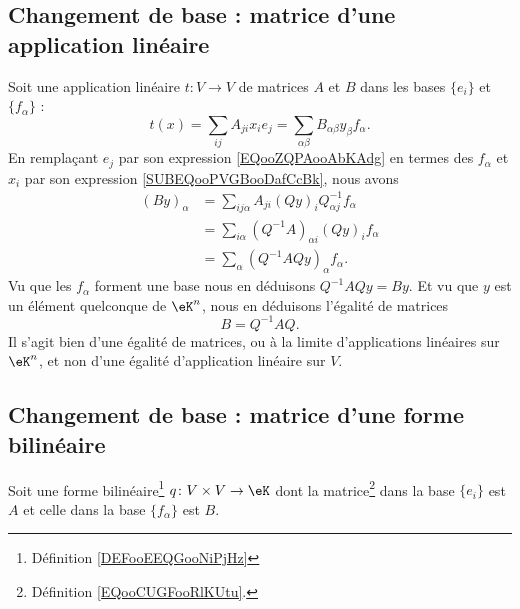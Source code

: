 \subsection{Changement de base : matrice d'une application linéaire}

Soit une application linéaire \( t\colon V\to V\) de matrices \( A\) et \( B\) dans les bases \( \{ e_i \}\) et \( \{ f_{\alpha} \}\) :
\begin{equation}
    t(x)=\sum_{ij}A_{ji}x_ie_j=\sum_{\alpha\beta}B_{\alpha\beta}y_{\beta}f_{\alpha}.
\end{equation}
En remplaçant \( e_j\) par son expression \eqref{EQooZQPAooAbKAdg} en termes des \( f_{\alpha}\) et \( x_i\) par son expression \eqref{SUBEQooPVGBooDafCcBk}, nous avons
\begin{subequations}
    \begin{align}
        (By)_{\alpha}&=\sum_{ij\alpha}A_{ji}(Qy)_iQ^{-1}_{\alpha j}f_{\alpha}\\
        &=\sum_{i \alpha}(Q^{-1}A)_{\alpha i}(Qy)_if_{\alpha}\\
        &=\sum_{\alpha}(Q^{-1} AQy)_{\alpha}f_{\alpha}.
    \end{align}
\end{subequations}
Vu que les \( f_{\alpha}\) forment une base nous en déduisons \( Q^{-1}AQy=By\). Et vu que \( y\) est un élément quelconque de \( \eK^n\), nous en déduisons l'égalité de matrices
\begin{equation}        \label{ooWKTYooOJfclT}
    B=Q^{-1}AQ.
\end{equation}
Il s'agit bien d'une égalité de matrices, ou à la limite d'applications linéaires sur \( \eK^n\), et non d'une égalité d'application linéaire sur \( V\).

\subsection{Changement de base : matrice d'une forme bilinéaire}

Soit une forme bilinéaire\footnote{Définition \ref{DEFooEEQGooNiPjHz}} \( q\colon V\times V\to \eK\) dont la matrice\footnote{Définition \ref{EQooCUGFooRlKUtu}.} dans la base \( \{ e_i \}\) est \( A\) et celle dans la base \( \{ f_{\alpha} \}\) est \( B\). 

